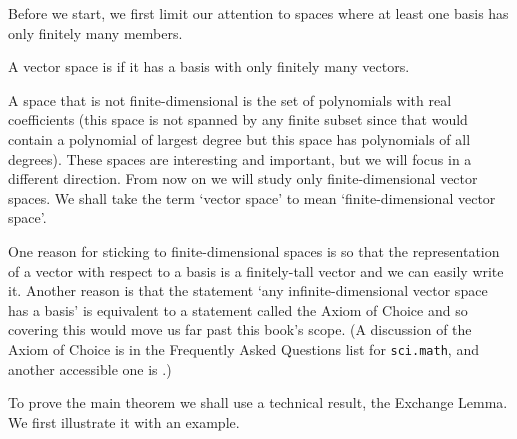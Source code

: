 Before we start, we first
limit our attention to spaces where at least one basis has only finitely
many members.

\begin{definition}
A vector space is %
if it has a basis with only finitely many vectors.
\end{definition}

\noindent A space that is not finite-dimensional is
the set of polynomials with real coefficients
(this space is not spanned by any finite subset since that would contain
a polynomial of largest degree but this space has polynomials of all degrees).
These spaces are interesting and important, but we will focus in a
different direction.
From now on we will study only finite-dimensional vector spaces.
We shall take the term `vector space' to mean 
`finite-dimensional vector space'.

\begin{remark}
One reason for sticking to finite-dimensional spaces is so that 
the representation of a vector with respect to a 
basis is a finitely-tall vector and we can easily write it.
Another reason is that 
the statement `any infinite-dimensional vector space has a basis'
is equivalent to a statement called the Axiom of Choice
\cite{Blass84} and so covering this would 
move us far past this book's scope.
(A discussion of the Axiom of Choice is in the
Frequently Asked Questions list for \texttt{sci.math}, and
another accessible one is \cite{Rucker}.)  
\end{remark}


To prove the main theorem we shall use a technical result, the Exchange Lemma.
We first illustrate it with an example.

